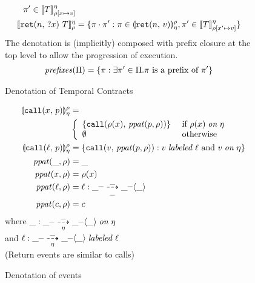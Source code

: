 \documentclass[preprint,onecolumn,9pt]{sigplanconf} %
\begin{document}
\begin{figure}
\begin{align*}
{             \mtrace' \in \denotetcon{\mtcon}{\mtimeline}{\menv[\mvar \mapsto \mval]}}
\\
   \denotetcon{\stret{\mname}{\mvar}{\mtcon}}{\mtimeline}{\menv} &=
   \setbuild{\mtrace\cdot \mtrace'}
            {\mtrace \in \denoteevent{\sretev{\mname}{\mval}}{\mtimeline}{\menv},
             \mtrace' \in \denotetcon{\mtcon}{\mtimeline}{\menv[\mvar' \mapsto \mval]}}
  \end{align*}
  The denotation is (implicitly) composed with prefix closure at the top level to allow the progression of execution.
  \begin{align*}
    \mathit{prefixes}(\Pi) &= \{\pi : \exists \pi' \in \Pi. \pi \text{ is a prefix of } \pi'\}
  \end{align*}
  \caption{Denotation of Temporal Contracts}
  \label{fig:tcontract-denotation}
\end{figure}

\begin{figure}
  \begin{align*}
    \llparenthesis {\tt call}(x,\, p) \rrparenthesis_{\eta}^{\rho} &= \\
    &\left\{\begin{array}{ll}
           \{{\tt call}(\rho(x),\,\mathit{ppat}(p, \rho))\} &\text{ if } \rho(x) \mathrel{\mathit{on}} \eta \\
           \emptyset & \text{ otherwise}
           \end{array}\right.
\\
    \llparenthesis {\tt call}(\ell,\, p) \rrparenthesis_{\eta}^{\rho} &=
      \{{\tt call}(v,\,\mathit{ppat}(p, \rho)) : v \mathrel{\mathit{labeled}} \ell \text{ and } v \mathrel{\mathit{on}} \eta\}
\\
   \mathit{ppat}(\_, \rho) &= \_
\\
   \mathit{ppat}(x, \rho) &= \rho(x)
\\
   \mathit{ppat}(\ell, \rho) &= \ell : \_^{\_} \overset{\_}{\underset{\_}{\dashrightarrow}} \_^{\_} \langle\_\rangle
\\
   \mathit{ppat}(c, \rho) &= c
  \end{align*}
  where $\_ : \_^{\_} \overset{\_}{\underset{\eta}{\dashrightarrow}} \_^{\_} \langle\_\rangle \mathrel{\mathit{on}} \eta$ \\
  and $\ell : \_^{\_} \overset{\_}{\underset{\eta}{\dashrightarrow}} \_^{\_} \langle\_\rangle \mathrel{\mathit{labeled}} \ell$ \\
  (Return events are similar to calls)
  \caption{Denotation of events}
  \label{fig:event-denotation}
\end{figure}
\end{document}
